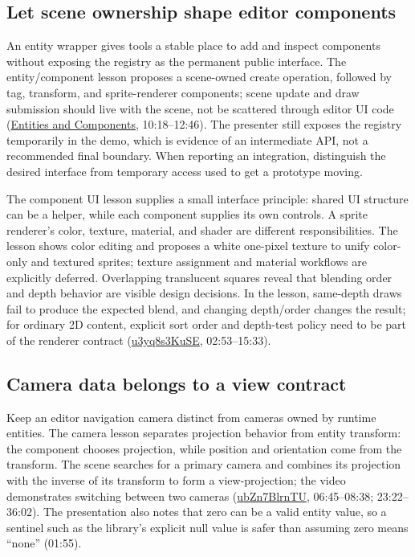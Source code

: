 \subsection{Let scene ownership shape editor components}\label{06-engine-ii-ch032-let-scene-ownership-shape-editor-components}

\hypertarget{06-engine-ii-ch032-let-scene-ownership-shape-editor-components}{}

An entity wrapper gives tools a stable place to add and inspect components without exposing the registry as the permanent public interface. The entity/component lesson proposes a scene-owned create operation, followed by tag, transform, and sprite-renderer components; scene update and draw submission should live with the scene, not be scattered through editor UI code (\href{https://www.youtube.com/watch?v=-B1iu4QJTUc}{Entities and Components}, 10:18--12:46). The presenter still exposes the registry temporarily in the demo, which is evidence of an intermediate API, not a recommended final boundary. When reporting an integration, distinguish the desired interface from temporary access used to get a prototype moving.

The component UI lesson supplies a small interface principle: shared UI structure can be a helper, while each component supplies its own controls. A sprite renderer's color, texture, material, and shader are different responsibilities. The lesson shows color editing and proposes a white one-pixel texture to unify color-only and textured sprites; texture assignment and material workflows are explicitly deferred. Overlapping translucent squares reveal that blending order and depth behavior are visible design decisions. In the lesson, same-depth draws fail to produce the expected blend, and changing depth/order changes the result; for ordinary 2D content, explicit sort order and depth-test policy need to be part of the renderer contract (\href{https://www.youtube.com/watch?v=u3yq8s3KuSE}{u3yq8s3KuSE}, 02:53--15:33).

\subsection{Camera data belongs to a view contract}\label{06-engine-ii-ch032-camera-data-belongs-to-a-view-contract}

\hypertarget{06-engine-ii-ch032-camera-data-belongs-to-a-view-contract}{}

Keep an editor navigation camera distinct from cameras owned by runtime entities. The camera lesson separates projection behavior from entity transform: the component chooses projection, while position and orientation come from the transform. The scene searches for a primary camera and combines its projection with the inverse of its transform to form a view-projection; the video demonstrates switching between two cameras (\href{https://www.youtube.com/watch?v=ubZn7BlrnTU}{ubZn7BlrnTU}, 06:45--08:38; 23:22--36:02). The presentation also notes that zero can be a valid entity value, so a sentinel such as the library's explicit null value is safer than assuming zero means ``none'' (01:55).

